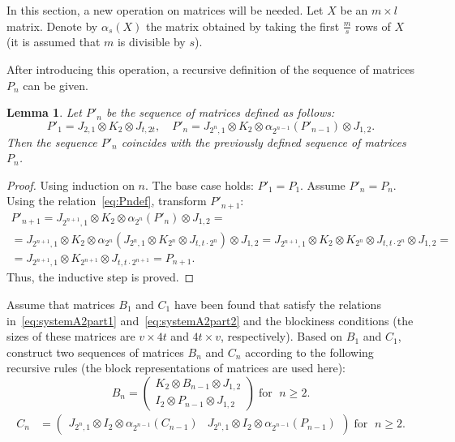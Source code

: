 \documentclass{article}
\newtheorem{lemma}{Lemma}
\begin{document}
In this section, a new operation on matrices will be needed. Let $X$ be an $m\times l$ matrix. Denote by $\alpha_s(X)$ the matrix obtained by taking the first $\frac{m}{s}$ rows of $X$ (it is assumed that $m$ is divisible by $s$).

After introducing this operation, a recursive definition of the sequence of matrices $P_n$ can be given.
\begin{lemma}
\label{lemma:Pn_newdef}
Let $P'_n$ be the sequence of matrices defined as follows:
\begin{equation}
P'_1 = J_{2, 1} \otimes K_2 \otimes J_{t, 2t}, \quad P'_n = J_{2^n, 1} \otimes K_2 \otimes \alpha_{2^{n-1}}(P'_{n-1}) \otimes J_{1, 2}.
\end{equation}
Then the sequence $P'_n$ coincides with the previously defined sequence of matrices $P_n$.
\end{lemma}

\begin{proof}
Using induction on $n$. The base case holds: $P'_1 = P_1$. Assume $P'_n = P_n$. Using the relation~\eqref{eq:Pndef}, transform $P'_{n+1}$:
\begin{multline}
P'_{n+1} = J_{2^{n+1}, 1} \otimes K_2 \otimes \alpha_{2^n}(P'_n) \otimes J_{1, 2} = \\ =
J_{2^{n+1}, 1} \otimes K_2 \otimes \alpha_{2^n}(J_{2^n, 1} \otimes K_{2^n} \otimes J_{t, t\cdot 2^n}) \otimes J_{1, 2} = J_{2^{n+1}, 1} \otimes K_2 \otimes K_{2^n} \otimes J_{t, t\cdot 2^n} \otimes J_{1, 2} = \\ =
J_{2^{n+1}, 1} \otimes K_{2^{n+1}} \otimes J_{t, t\cdot 2^{n+1}} = P_{n+1}.
\end{multline}
Thus, the inductive step is proved.
\end{proof}

Assume that matrices $B_1$ and $C_1$ have been found that satisfy the relations in~\eqref{eq:systemA2part1} and~\eqref{eq:systemA2part2} and the blockiness conditions (the sizes of these matrices are $v\times 4t$ and $4t\times v$, respectively). Based on $B_1$ and $C_1$, construct two sequences of matrices $B_n$ and $C_n$ according to the following recursive rules (the block representations of matrices are used here):
\begin{equation}
\label{eq:recBn}
B_n = \left(
\begin{array}{c}
K_2 \otimes B_{n-1} \otimes J_{1, 2} \\ \hline
I_2 \otimes P_{n-1} \otimes J_{1, 2}
\end{array}
\right) \; \text{for } \; n\geqslant 2.
\end{equation}
\begin{equation}
\label{eq:recCn}
\begin{split}
C_n& = \left(
\begin{array}{c|c}
J_{2^n, 1} \otimes I_2 \otimes \alpha_{2^{n-1}}(C_{n-1}) & J_{2^n, 1} \otimes I_2 \otimes \alpha_{2^{n-1}}(P_{n-1})
\end{array}
\right) \; \text{for } \; n\geqslant 2.
\end{split}
\end{equation}
\end{document}

